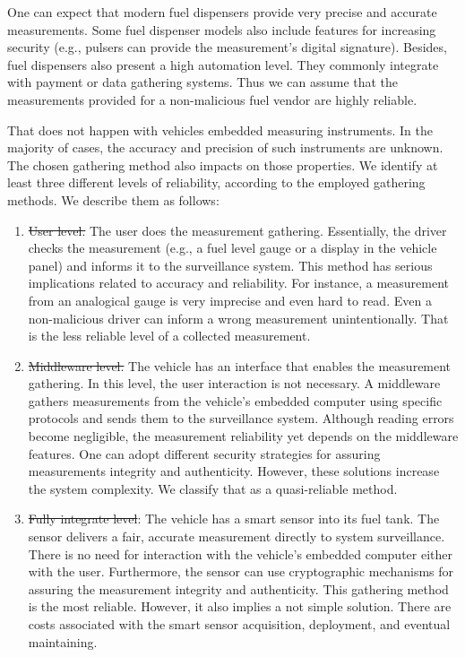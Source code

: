 \documentclass[sigplan]{acmart}
\providecommand{\DIFadd}[1]{{\protect\color{blue}\uwave{#1}}} %
\providecommand{\DIFdel}[1]{{\protect\color{red}\sout{#1}}}                      %
\providecommand{\DIFaddbegin}{} %
\providecommand{\DIFaddend}{} %
\providecommand{\DIFdelbegin}{} %
\providecommand{\DIFdelend}{} %
\begin{document}
One can expect that modern fuel dispensers provide very precise and accurate measurements.
Some fuel dispenser models also include features for increasing security (e.g., pulsers can provide the measurement's digital signature).
Besides, fuel dispensers also present a high automation level.
They commonly integrate with payment or data gathering systems.
Thus we can assume that the measurements provided for a non-malicious fuel vendor are highly reliable.

That does not happen with vehicles embedded measuring instruments.
In the majority of cases, the accuracy and precision of such instruments are unknown.
The chosen gathering method also impacts on those properties.
We identify at least three different levels of reliability, according to the employed gathering methods.
We describe them as follows:
\begin{enumerate}
 \item \DIFdelbegin \DIFdel{User level. }\DIFdelend \DIFaddbegin \textbf{\DIFadd{User level.}} \DIFaddend The user does the measurement gathering. 
  Essentially, the driver checks the measurement (e.g., a fuel level gauge or a display in the vehicle panel) and informs it to the surveillance system. 
  This method has serious implications related to accuracy and reliability.
  For instance, a measurement from an analogical gauge is very imprecise and even hard to read.
  Even a non-malicious driver can inform a wrong measurement unintentionally.
  That is the less reliable level of a collected measurement.
  \item \DIFdelbegin \DIFdel{Middleware level. }\DIFdelend \DIFaddbegin \textbf{\DIFadd{Middleware level.}} \DIFaddend The vehicle has an interface that enables the measurement gathering.
  In this level, the user interaction is not necessary.
  A middleware gathers measurements from the vehicle's embedded computer using specific protocols and sends them to the surveillance system.
  Although reading errors become negligible, the measurement reliability yet depends on the middleware features.
  One can adopt different security strategies for assuring measurements integrity and authenticity.
  However, these solutions increase the system complexity.
  We classify that as a quasi-reliable method.
  \item \DIFdelbegin \DIFdel{Fully integrate level}\DIFdelend \DIFaddbegin \textbf{\DIFadd{Fully integrate level}}\DIFaddend : The vehicle has a smart sensor into its fuel tank.
  The sensor delivers a fair, accurate measurement directly to system surveillance.
  There is no need for interaction with the vehicle's embedded computer either with the user.
  Furthermore, the sensor can use cryptographic mechanisms for assuring the measurement integrity and authenticity.
  This gathering method is the most reliable.
  However, it also implies a not simple solution.
  There are costs associated with the smart sensor acquisition, deployment, and eventual maintaining.
\end{enumerate}
\end{document}
